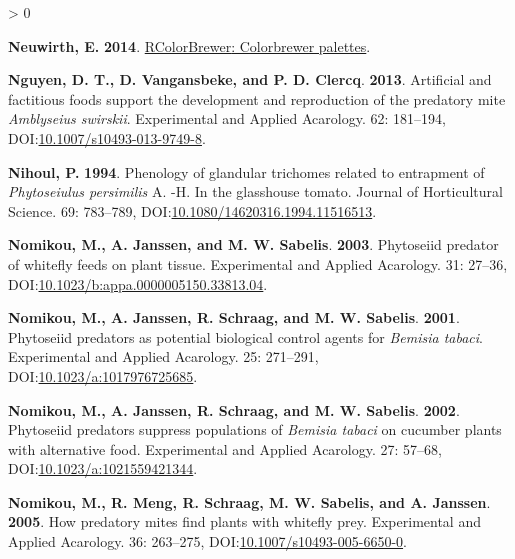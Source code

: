 \documentclass{ufdissertation}[overrideChapters] %
\newlength{\cslhangindent}
\newenvironment{CSLReferences}[2] %
 {%
  \setlength{\parindent}{0pt}
  \ifodd #1 \everypar{\setlength{\hangindent}{\cslhangindent}}\ignorespaces\fi
  \ifnum #2 > 0
  \setlength{\parskip}{#2\baselineskip}
  \fi
 }%
 {}
\begin{document}
{\begin{CSLReferences}{1}{1}
\leavevmode{}%
\textbf{Neuwirth, E.} \textbf{2014}. \href{https://CRAN.R-project.org/package=RColorBrewer}{{RColorBrewer}: Colorbrewer palettes}.

\leavevmode{}%
\textbf{Nguyen, D. T., D. Vangansbeke, and P. D. Clercq}. \textbf{2013}. Artificial and factitious foods support the development and reproduction of the predatory mite {\emph{Amblyseius swirskii}}. Experimental and Applied Acarology. 62: 181--194, DOI:\href{https://doi.org/10.1007/s10493-013-9749-8}{10.1007/s10493-013-9749-8}.

\leavevmode{}%
\textbf{Nihoul, P.} \textbf{1994}. Phenology of glandular trichomes related to entrapment of {\emph{Phytoseiulus persimilis}} {A.} -{H}. In the glasshouse tomato. Journal of Horticultural Science. 69: 783--789, DOI:\href{https://doi.org/10.1080/14620316.1994.11516513}{10.1080/14620316.1994.11516513}.

\leavevmode{}%
\textbf{Nomikou, M., A. Janssen, and M. W. Sabelis}. \textbf{2003}. Phytoseiid predator of whitefly feeds on plant tissue. Experimental and Applied Acarology. 31: 27--36, DOI:\href{https://doi.org/10.1023/b:appa.0000005150.33813.04}{10.1023/b:appa.0000005150.33813.04}.

\leavevmode{}%
\textbf{Nomikou, M., A. Janssen, R. Schraag, and M. W. Sabelis}. \textbf{2001}. Phytoseiid predators as potential biological control agents for {\emph{Bemisia tabaci}}. Experimental and Applied Acarology. 25: 271--291, DOI:\href{https://doi.org/10.1023/a:1017976725685}{10.1023/a:1017976725685}.

\leavevmode{}%
\textbf{Nomikou, M., A. Janssen, R. Schraag, and M. W. Sabelis}. \textbf{2002}. Phytoseiid predators suppress populations of {\emph{Bemisia tabaci}} on cucumber plants with alternative food. Experimental and Applied Acarology. 27: 57--68, DOI:\href{https://doi.org/10.1023/a:1021559421344}{10.1023/a:1021559421344}.

\leavevmode{}%
\textbf{Nomikou, M., R. Meng, R. Schraag, M. W. Sabelis, and A. Janssen}. \textbf{2005}. How predatory mites find plants with whitefly prey. Experimental and Applied Acarology. 36: 263--275, DOI:\href{https://doi.org/10.1007/s10493-005-6650-0}{10.1007/s10493-005-6650-0}.


\end{CSLReferences}}
\end{document}
